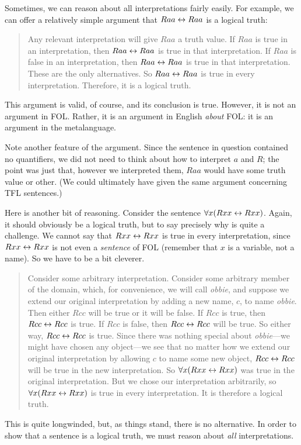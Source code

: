 Sometimes, we can reason about all interpretations fairly easily. For example, we can offer a relatively simple argument that $Raa\leftrightarrow Raa$ is a logical truth:
	\begin{quote}
		\label{allmodels1}
		Any relevant interpretation will give $Raa$ a truth value. If $Raa$ is true in an interpretation, then $Raa \leftrightarrow Raa$ is true in that interpretation. If $Raa$ is false in an interpretation, then $Raa \leftrightarrow Raa$ is true in that interpretation. These are the only alternatives. So $Raa \leftrightarrow Raa$ is true in every interpretation. Therefore, it is a logical truth.
	\end{quote}
This argument is valid, of course, and its conclusion is true. However, it is not an argument in FOL. Rather, it is an argument in English \emph{about} FOL: it is an argument in the metalanguage.

Note another feature of the argument. Since the sentence in question contained no quantifiers, we did not need to think about how to interpret $a$ and $R$; the point was just that, however we interpreted them, $Raa$ would have some truth value or other. (We could ultimately have given the same argument concerning TFL sentences.)

Here is another bit of reasoning. Consider the sentence $\forall x(Rxx\leftrightarrow Rxx)$. Again, it should obviously be a logical truth, but to say precisely why is quite a challenge. We cannot say that $Rxx \leftrightarrow Rxx$ is true in every interpretation, since $Rxx \leftrightarrow Rxx$ is not even a \emph{sentence} of FOL (remember that $x$ is a variable, not a name). So we have to be a bit cleverer.
	\begin{quote}
		Consider some arbitrary interpretation. Consider some arbitrary member of the domain, which, for convenience, we will call \emph{obbie}, and suppose we extend our original interpretation by adding a new name, $c$, to name \emph{obbie}. Then either $Rcc$ will be true or it will be false. If $Rcc$ is true, then $Rcc \leftrightarrow Rcc$ is true. If $Rcc$ is false, then $Rcc \leftrightarrow Rcc$ will be true. So either way, $Rcc \leftrightarrow Rcc$ is true. Since there was nothing special about \emph{obbie}---we might have chosen any object---we see that no matter how we extend our original interpretation by allowing $c$ to name some new object, $Rcc \leftrightarrow Rcc$ will be true in the new interpretation. So $\forall x (Rxx \leftrightarrow Rxx)$ was true in the original interpretation. But we chose our interpretation arbitrarily, so $\forall x (Rxx \leftrightarrow Rxx)$ is true in every interpretation. It is therefore a logical truth.
	\end{quote}
This is quite longwinded, but, as things stand, there is no alternative. In order to show that a sentence is a logical truth, we must reason about \emph{all} interpretations.

